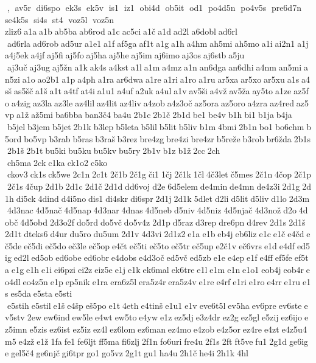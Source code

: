 ,  av5r  di6spo  ek3s  ek5v  is1  iz1  obi4d  ob5it  od1  po4d5n  po4v5s  pre6d7n  se4k5s  si4s  st4  voz5l  voz5n  zliz6 a1a a1b ab5ba ab6rod a1c ac5ci a1č a1d ad2l a6dobl ad6rl  ad6rla ad6rob ad5ur a1e1 a1f af5ga af1t a1g a1h a4hm ah5mi ah5mo a1i ai2n1 a1j a4j5ek a4jf aj5fi aj5fo aj5ha aj5he aj5im aj6imo aj3os aj6stb a5ju  aj3uč aj3ug aj5žn a1k ak4s a4kst a1l a1m a4mz a1n an6dga an6dhi a4nm an5mi an5zi a1o ao2b1 a1p a4ph a1ra ar6dwa a1re a1ri a1ro a1ru ar5xa ar5xo ar5xu a1s a4sš as5šč a1š a1t a4tf at4i a1u1 a4uf a2uk a4ul a1v av5ši a4vž av5ža ay5to a1ze az5fo a4zig az3la az3le az4lil az4lit az4liv a4zob a4z3oč az5ora az5oro a4zra az4red az5vp a1ž až5mi ba6bba ban3č4 ba4u 2b1c 2b1č 2b1d be1 be4v b1h bi1 b1ja b4ja  b5jel b3jem b5jet 2b1k b3lep b5leta b5lil b5lit b5liv b1m 4bmi 2b1n bo1 bo6chm b5ord bo5vp b3rab b5ras b3raš b3rez bre4zg bre4zi bre4zr b5reže b3rob br6žda 2b1s 2b1š 2b1t bu5ki bu5ku bu5kv bu5ry 2b1v b1z b1ž 2cc 2ch  ch5ma 2ck c1ka ck1o2 c5ko  ckov3 ck1s ck5we 2c1n 2c1t 2č1b 2č1g či1 1čj 2č1k 1čl 4č3let č5mes 2č1n 4čop 2č1p 2č1s 4čup 2d1b 2d1c 2d1č 2d1d dd6voj d2e 6d5elem de4min de4mn de4z3i 2d1g 2d1h di5ck 4dind d4i5no dis1 di4skr di6spr 2d1j 2d1k 5dlet d2li d5lit d5liv d1lo 2d3m 4d3nac 4d5nač 4d5nap 4d3nar 4dnas 4d5neb d5niv 4d5niz 4d5njač 4d3nož d2o 4dobč 4d5obd 2d3o2f do5rd do5vč do5v4z 2d1p d5raz d3rep dre6pn d4rev 2d1s 2d1š 2d1t dteks6 d4ur du5ro du5um 2d1v 4d3vi 2d1z2 e1a e1b eb4j eb6liz e1c e1č e4čd eč5de eč5di eč5do eč3le eč5op e4čt eč5ti eč5to eč5tr eč5up e2č1v eč6vrs e1d e4df ed5ig ed2l ed5ob ed6obe ed6obr e4dobs e4d3oč ed5vč ed5zb e1e e4ep e1f e4ff ef5fe ef5ta e1g e1h e1i ei6pzi ei2z eiz5e e1j e1k ek6mal ek6tre e1l e1m e1n e1o1 eob4j eob4r eo4dl eo4z5n e1p ep5nik e1ra era6z5l era5z4r era5z4v e1re e4rf e1ri e1ro e4rr e1ru e1s es5da e5sta e5sti  e5stih e5stil e1š e4šp eš5po e1t 4eth e4tinš e1u1 e1v eve6t5l ev5ha ev6pre ev6ste ev5stv 2ew ew6ind ew5le e4wt ew5to e4yw e1z ez5dj e3z4dr ez2g ez5gl e5zij ez6ijo ez5imn e5zis ez6ist ez5iz ez4l ez6lom ez6man ez4mo e4zob e4z5or ez4re e4zt e4z5u4m5 e4zž e1ž 1fa fe1 fe6ljt ff5ma fi6zlj 2f1n fo6uri fre4u 2f1s 2ft ft5ve fu1 2g1d ge6ige gel5č4 ge6njč gi6tpr go1 go5vz 2g1t gu1 ha4u 2h1č he4i 2h1k 4hl 